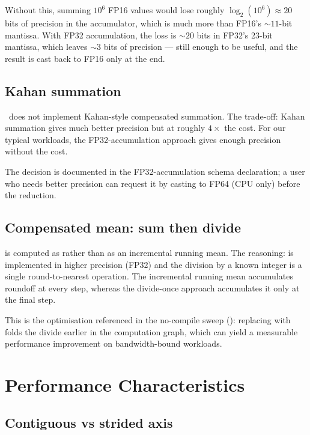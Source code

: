 Without this, summing \(10^6\) FP16 values would lose roughly
\(\log_2(10^6) \approx 20\) bits of precision in the accumulator,
which is much more than FP16's \(\sim 11\)-bit mantissa. With FP32
accumulation, the loss is \(\sim 20\) bits in FP32's 23-bit
mantissa, which leaves \(\sim 3\) bits of precision --- still
enough to be useful, and the result is cast back to FP16 only at
the end.

\subsection{Kahan summation}
\label{ssec:reductions:kahan}

\Lucid\ does not implement Kahan-style compensated summation. The
trade-off: Kahan summation gives much better precision but at
roughly \(4\times\) the cost. For our typical workloads, the
FP32-accumulation approach gives enough precision without the cost.

The decision is documented in the FP32-accumulation schema
declaration; a user who needs better precision can request it by
casting to FP64 (CPU only) before the reduction.

\subsection{Compensated mean: sum then divide}
\label{ssec:reductions:mean_div}

 is computed as  rather than
as an incremental running mean. The reasoning:  is
implemented in higher precision (FP32) and the division by a
known integer is a single round-to-nearest operation. The
incremental running mean accumulates roundoff at every step,
whereas the divide-once approach accumulates it only at the
final step.

This is the optimisation referenced in the no-compile sweep
(): replacing  with
 folds the divide earlier in the computation graph,
which can yield a measurable performance improvement on
bandwidth-bound workloads.

\section{Performance Characteristics}
\label{sec:reductions:perf}

\subsection{Contiguous vs strided axis}
\label{ssec:reductions:contig_strided}


